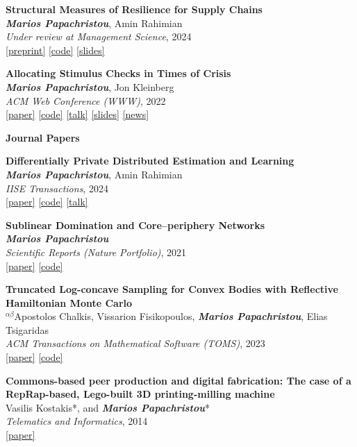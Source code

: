 \documentclass[margin]{res}
\newcommand{\field}[2]{\noindent \textbf{#1} \hfill #2 \\}
\newcommand{\alphabeticalorder}[0]{\ensuremath {^{\alpha \beta}}}
\newcommand{\specialurl}[2]{\href {#2} {{{[#1]}}}}
\newcommand{\preprint}[1]{\specialurl {preprint} {#1}}
\newcommand{\code}[1]{\specialurl {code} {#1}}
\newcommand{\talk}[1]{\specialurl {talk} {#1}}
\newcommand{\slides}[1]{\specialurl {slides} {#1}}
\newcommand{\paper}[1]{\specialurl {paper} {#1}}
\newcommand{\authorref}[1]{{\textit{\textbf{#1}}}}
\newcommand{\news}[1]{\specialurl {news} {#1}}
\newcommand{\authorme}{\authorref{Marios Papachristou}}
\newcommand{\publication}[5]{\textbf{#1}\\{#2}\\\emph{#3}, {#4}\\{#5}\smallskip}
\begin{document}
\begin{resume}
{\begin{enumerate}[nosep, label={[S\arabic*]}]
   \item \publication{Structural Measures of Resilience for Supply Chains}{\authorme, Amin Rahimian}{Under review at Management Science}{2024}{ 
   		\preprint{https://papers.ssrn.com/sol3/papers.cfm?abstract_id=4392226} \code{https://github.com/papachristoumarios/supply-chain-resilience} \slides{https://drive.google.com/file/d/13kgKnjTHyO8j4BOJVykWwt43hSt3JrLw/view?usp=drive_link}}
   	\item \publication{Allocating Stimulus Checks in Times of Crisis}{\authorme, Jon Kleinberg}{ACM Web Conference (WWW)}{2022}{\paper{https://doi.org/10.1145/3485447.3512047} \code{https://github.com/papachristoumarios/financial-contagion}  \talk{https://youtu.be/WUmPBztK8Mo} \slides{https://drive.google.com/file/d/1v4v4jPOTzFtP8a5dhAFLoIjZSRDxAjBz/view?usp=sharing} \news{https://www.minneapolisfed.org/article/2022/social-policy-in-the-age-of-algorithms-an-interview-with-jon-kleinberg}}   
	
\end{enumerate}}

\field{Journal Papers}{}{
\begin{enumerate}[nosep, label={[J\arabic*]}]    
   \item \publication{Differentially Private Distributed Estimation and Learning}{\authorme, Amin Rahimian}{IISE Transactions}{2024}{
   	   	\paper{https://doi.org/10.1080/24725854.2024.2337068} \code{https://github.com/papachristoumarios/dp-distributed-estimation} \talk{https://www.youtube.com/watch?v=Kmm5HEMuS4w}}

  
   \item \publication{Sublinear Domination and Core--periphery Networks}{\authorme}{Scientific Reports (Nature Portfolio)}{2021}{\paper{http://www.nature.com/articles/s41598-021-94105-8} \code{https://bit.ly/3wKNGI0}}
    \item \publication{Truncated Log-concave Sampling for Convex Bodies with Reflective Hamiltonian Monte Carlo}{\alphabeticalorder Apostolos Chalkis, Vissarion Fisikopoulos, \authorme, Elias Tsigaridas}{ACM Transactions on Mathematical Software (TOMS)}{2023}{\paper{https://doi.org/10.1145/3589505} \code{https://github.com/GeomScale/volume_approximation}}
    \item \publication{Commons-based peer production and digital fabrication: The case of a RepRap-based, Lego-built 3D printing-milling machine}{Vasilis Kostakis*, and \authorme*}{Telematics and Informatics}{2014}{\paper{https://bit.ly/2JRoisV}} 
    

\end{enumerate}}
\end{resume}
\end{document}
